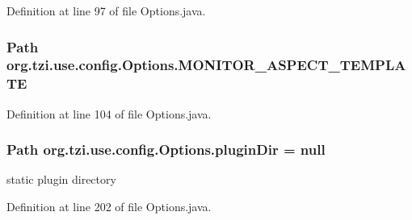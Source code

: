 Definition at line 97 of file Options.\-java.

\hypertarget{classorg_1_1tzi_1_1use_1_1config_1_1_options_a5c5e7bc1805a38bf5a603c90a42fa90a}{
\subsubsection[{M\-O\-N\-I\-T\-O\-R\-\_\-\-A\-S\-P\-E\-C\-T\-\_\-\-T\-E\-M\-P\-L\-A\-T\-E}]{\setlength{\rightskip}{0pt plus 5cm}Path org.\-tzi.\-use.\-config.\-Options.\-M\-O\-N\-I\-T\-O\-R\-\_\-\-A\-S\-P\-E\-C\-T\-\_\-\-T\-E\-M\-P\-L\-A\-T\-E\hspace{0.3cm}{\ttfamily [static]}}}\label{classorg_1_1tzi_1_1use_1_1config_1_1_options_a5c5e7bc1805a38bf5a603c90a42fa90a}


Definition at line 104 of file Options.\-java.

\hypertarget{classorg_1_1tzi_1_1use_1_1config_1_1_options_ab9d2183970e6f0a366d10163c0ba0655}{
\subsubsection[{plugin\-Dir}]{\setlength{\rightskip}{0pt plus 5cm}Path org.\-tzi.\-use.\-config.\-Options.\-plugin\-Dir = null\hspace{0.3cm}{\ttfamily [static]}}}\label{classorg_1_1tzi_1_1use_1_1config_1_1_options_ab9d2183970e6f0a366d10163c0ba0655}
static plugin directory 

Definition at line 202 of file Options.\-java.

